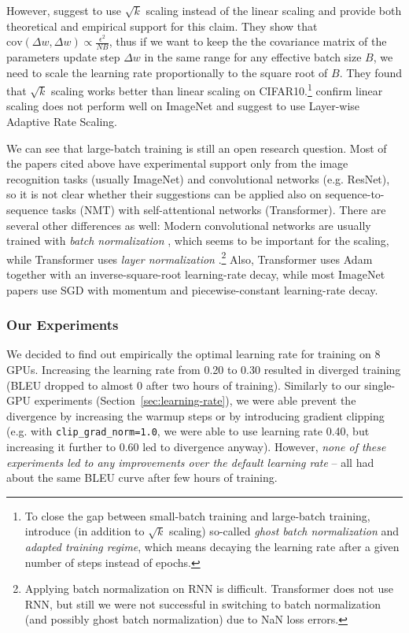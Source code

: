 \documentclass{pbmlarxiv} \pdfoutput=1
\def\recommend#1{\textsl{#1}}
\def\Sref#1{Section~\ref{#1}}
\begin{document}
However, \citet{hoffer-et-al-2017} suggest to use $\sqrt{k}$ scaling instead of the linear scaling
 and provide both theoretical and empirical support for this claim.
They show that $\textrm{cov}(\Delta w, \Delta w) \propto \frac{\epsilon^2}{NB}$,
 thus if we want to keep the the covariance matrix of the parameters update step $\Delta w$
 in the same range for any effective batch size $B$,
 we need to scale the learning rate proportionally to the square root of $B$.
They found that $\sqrt{k}$ scaling works better than linear scaling on CIFAR10.\footnote{
 To close the gap between small-batch training and large-batch training,
  \citet{hoffer-et-al-2017} introduce (in addition to $\sqrt{k}$ scaling) so-called \emph{ghost batch normalization}
  and \emph{adapted training regime},
  which means decaying the learning rate after a given number of steps instead of epochs.
}
\citet{you-et-al:2017} confirm linear scaling does not perform well on ImageNet
 and suggest to use Layer-wise Adaptive Rate Scaling.

We can see that large-batch training is still an open research question. %
Most of the papers cited above have experimental support only from the image recognition tasks (usually ImageNet)
 and convolutional networks (e.g. ResNet),
 so it is not clear whether their suggestions can be applied also on sequence-to-sequence tasks (NMT)
 with self-attentional networks (Transformer).
There are several other differences as well:
Modern convolutional networks are usually trained with \emph{batch normalization} \citep{batch-norm},
 which seems to be important for the scaling,
 while Transformer uses \emph{layer normalization} \citep{layer-norm}.\footnote{
  Applying batch normalization on RNN is difficult.
  Transformer does not use RNN, but still we were not successful
   in switching to batch normalization (and possibly ghost batch normalization)
   due to NaN loss errors.
 }
Also, Transformer uses Adam together with an inverse-square-root learning-rate decay,
 while most ImageNet papers use SGD with momentum and piecewise-constant learning-rate decay.

\subsubsection{Our Experiments}
We decided to find out empirically the optimal learning rate for training on 8 GPUs.
Increasing the learning rate from 0.20 to 0.30
 resulted in diverged training (BLEU dropped to almost 0 after two hours of training).
Similarly to our single-GPU experiments (\Sref{sec:learning-rate}),
 we were able prevent the divergence by increasing the warmup steps
 or by introducing gradient clipping
 (e.g. with \verb|clip_grad_norm=1.0|, we were able to use learning rate 0.40,
 but increasing it further to 0.60 led to divergence anyway).
However, \recommend{none of these experiments led to any improvements over the default learning rate} --
 all had about the same BLEU curve after few hours of training.
\end{document}
